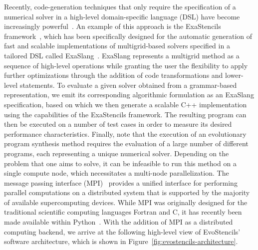 Recently, code-generation techniques that only require the specification of a numerical solver in a high-level domain-specific language (DSL) have become increasingly powerful~\cite{kostler2020code}.
An example of this approach is the ExaStencils framework~\cite{lengauer2020exastencils,lengauer2014exastencils}, which has been specifically designed for the automatic generation of fast and scalable implementations of multigrid-based solvers specified in a tailored DSL called ExaSlang~\cite{schmitt2014exaslang,schmitt2016systems,kuckuk2016automatic}.
ExaSlang represents a multigrid method as a sequence of high-level operations while granting the user the flexibility to apply further optimizations through the addition of code transformations and lower-level statements.
To evaluate a given solver obtained from a grammar-based representation, we emit its corresponding algorithmic formulation as an ExaSlang specification, based on which we then generate a scalable C++ implementation using the capabilities of the ExaStencils framework.
The resulting program can then be executed on a number of test cases in order to measure its desired performance characteristics.
Finally, note that the execution of an evolutionary program synthesis method requires the evaluation of a large number of different programs, each representing a unique numerical solver.
Depending on the problem that one aims to solve, it can be infeasible to run this method on a single compute node, which necessitates a multi-node parallelization.
The message passing interface (MPI)~\cite{walker1996mpi} provides a unified interface for performing parallel computations on a distributed system that is supported by the majority of available supercomputing devices.
While MPI was originally designed for the traditional scientific computing languages Fortran and C, it has recently been made available within Python~\cite{dalcin2021mpi4py}. 
With the addition of MPI as a distributed computing backend, we arrive at the following high-level view of EvoStencils' software architecture, which is shown in Figure~\ref{fig:evostencils-architecture}.
